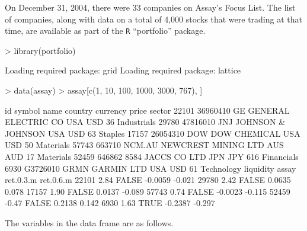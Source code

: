 \documentclass{article}
\begin{document}
On December 31, 2004, there were 33 companies on Assay's Focus List.
The list of companies, along with data on a total of 4,000 stocks that
were trading at that time, are available as part of the \texttt{R}
``portfolio'' package.

\begin{Schunk}
\begin{Sinput}
> library(portfolio)
\end{Sinput}
\begin{Soutput}
Loading required package: grid
Loading required package: lattice
\end{Soutput}
\begin{Sinput}
> data(assay)
> assay[c(1, 10, 100, 1000, 3000, 767), ]
\end{Sinput}
\begin{Soutput}
            id symbol                name country currency price      sector
22101 36960410     GE GENERAL ELECTRIC CO     USA      USD    36 Industrials
29780 47816010    JNJ   JOHNSON & JOHNSON     USA      USD    63     Staples
17157 26054310    DOW        DOW CHEMICAL     USA      USD    50   Materials
57743   663710 NCM.AU NEWCREST MINING LTD     AUS      AUD    17   Materials
52459   646862   8584        JACCS CO LTD     JPN      JPY   616  Financials
6930  G3726010   GRMN          GARMIN LTD     USA      USD    61  Technology
      liquidity assay ret.0.3.m ret.0.6.m
22101      2.84 FALSE   -0.0059    -0.021
29780      2.42 FALSE    0.0635     0.078
17157      1.90 FALSE    0.0137    -0.089
57743      0.74 FALSE   -0.0023    -0.115
52459     -0.47 FALSE    0.2138     0.142
6930       1.63  TRUE   -0.2387    -0.297
\end{Soutput}
\end{Schunk}

The variables in the data frame are as follows.
\end{document}
